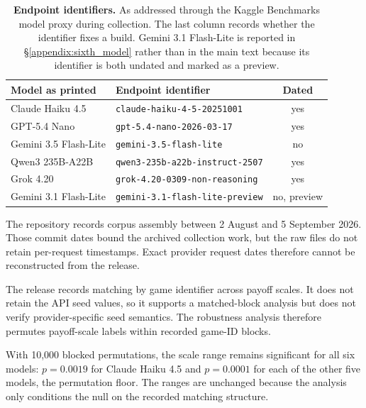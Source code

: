 \documentclass[11pt,a4paper]{article}
\begin{document}
\begin{table}[htbp]
\centering
\footnotesize
\caption{\textbf{Endpoint identifiers.} As addressed through the Kaggle Benchmarks model proxy during collection. The last column records whether the identifier fixes a build. Gemini 3.1 Flash-Lite is reported in \S\ref{appendix:sixth_model} rather than in the main text because its identifier is both undated and marked as a preview.}
\label{tab:A-endpoints}
\begin{tabular}{@{}llc@{}}
\toprule
Model as printed & Endpoint identifier & Dated \\
\midrule
Claude Haiku 4.5      & \texttt{claude-haiku-4-5-20251001}      & yes \\
GPT-5.4 Nano          & \texttt{gpt-5.4-nano-2026-03-17}        & yes \\
Gemini 3.5 Flash-Lite & \texttt{gemini-3.5-flash-lite}          & no  \\
Qwen3 235B-A22B       & \texttt{qwen3-235b-a22b-instruct-2507}  & yes \\
Grok 4.20             & \texttt{grok-4.20-0309-non-reasoning}   & yes \\
Gemini 3.1 Flash-Lite & \texttt{gemini-3.1-flash-lite-preview}  & no, preview \\
\bottomrule
\end{tabular}
\end{table}

The repository records corpus assembly between 2 August and 5 September 2026. Those commit dates bound the archived collection work, but the raw files do not retain per-request timestamps. Exact provider request dates therefore cannot be reconstructed from the release.

The release records matching by game identifier across payoff scales. It does not retain the API seed values, so it supports a matched-block analysis but does not verify provider-specific seed semantics. The robustness analysis therefore permutes payoff-scale labels within recorded game-ID blocks.

With 10,000 blocked permutations, the scale range remains significant for all six models: $p=0.0019$ for Claude Haiku 4.5 and $p=0.0001$ for each of the other five models, the permutation floor. The ranges are unchanged because the analysis only conditions the null on the recorded matching structure.
\end{document}
